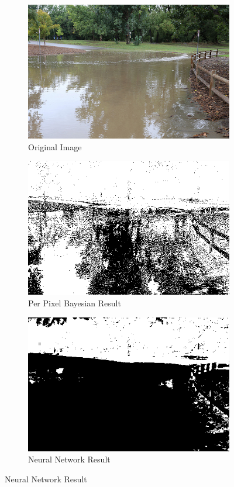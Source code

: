 \documentclass[12pt]{article}
\begin{document}
\begin{figure}
\begin{subfigure}{.33\textwidth}
  \centering
  \includegraphics[width=.9\linewidth]{./images/sourceImages/9731928435_8f83f7253e.png}
  \caption{Original Image}
\end{subfigure}%
\begin{subfigure}{.33\textwidth}
  \centering
  \includegraphics[width=.9\linewidth]{./images/perPixelBayesianClassifierPrimaryResults/9731928435_8f83f7253e.png}
  \caption{Per Pixel Bayesian Result}
\end{subfigure}%
\begin{subfigure}{.33\textwidth}
  \centering
  \includegraphics[width=.9\linewidth]{./images/NeuralNetworkClassifierpt339602PrimaryResults25NodeLayers/9731928435_8f83f7253e.png}
  \caption{Neural Network Result}
\end{subfigure}%


\end{figure}
\end{document}
